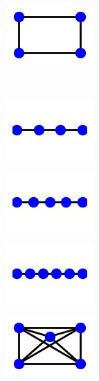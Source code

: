 \begin{figure}
\begin{center}
\begin{subfigure}{2.25cm}
        \caption{}
    \end{subfigure}
    \qquad
    \begin{subfigure}{2.25cm} 
        \begin{center}
            \includegraphics{theoretical_study/figures/lattices/_4_site_square.jpg}        
        \end{center}
        \caption{}
    \end{subfigure}
    \\
    \begin{subfigure}{2.25cm} 
        \includegraphics{theoretical_study/figures/lattices/_4_site_chain.jpg}        
        \caption{}
    \end{subfigure}
    \qquad
    \begin{subfigure}{2.25cm} 
        \includegraphics{theoretical_study/figures/lattices/_5_site_chain.jpg}        
        \caption{}
    \end{subfigure}
    \qquad
    \begin{subfigure}{2.25cm} 
        \includegraphics{theoretical_study/figures/lattices/_6_site_chain.jpg}        
        \caption{}
    \end{subfigure}
    \qquad
    \begin{subfigure}{2.25cm} 
        \includegraphics{theoretical_study/figures/lattices/_5_site_lattice_fully_connected.jpg}        

\end{subfigure}
\end{center}
\end{figure}
